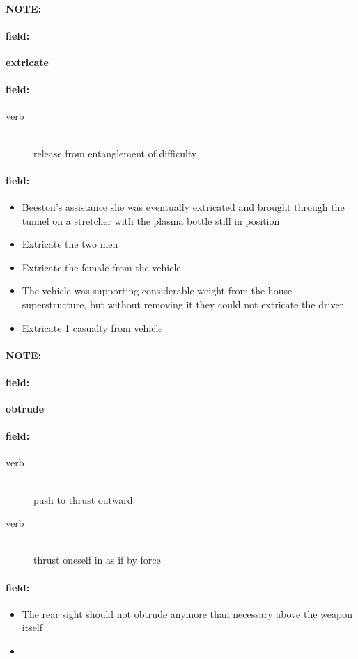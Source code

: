 \documentclass[12pt]{article}
\newenvironment{note}{\paragraph{NOTE:}}{}
\newenvironment{field}{\paragraph{field:}}{}
\begin{document}
\begin{note}
\begin{field}
\textbf{\large extricate}
\end{field}


\begin{field}
\begin{description}
\item[verb] \hfill \\ 
release from entanglement of difficulty

\end{description}
\end{field}

\begin{field}
\begin{itemize}
\item  Beeston's assistance she was eventually extricated and brought through the tunnel on a stretcher with the plasma bottle still in position
\item Extricate the two men
\item Extricate the female from the vehicle
\item The vehicle was supporting considerable weight from the house superstructure, but without removing it they could not extricate the driver
\item Extricate 1 casualty from vehicle
\end{itemize}
\end{field}
\end{note}
\begin{note}
\begin{field}
\textbf{\large obtrude}
\end{field}


\begin{field}
\begin{description}
\item[verb] \hfill \\ 
push to thrust outward

\item[verb] \hfill \\ 
thrust oneself in as if by force

\end{description}
\end{field}

\begin{field}
\begin{itemize}
\item The rear sight should not obtrude anymore than necessary above the weapon itself
\item 
\end{itemize}
\end{field}
\end{note}
\end{document}
